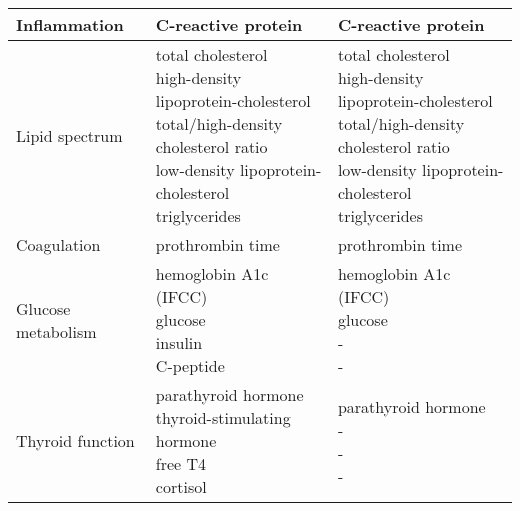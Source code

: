 \documentclass[10pt,a4paper]{article}
\begin{document}
\begin{table}
\begin{tabular}{lll}
			Inflammation          & C-reactive protein                                                                                                                                  & C-reactive protein                                                                                                                                  \\ \hline
			Lipid spectrum        & total \makecell{cholesterol\\high-density lipoprotein-cholesterol\\total/high-density cholesterol ratio \\low-density lipoprotein-cholesterol \\triglycerides} & \makecell{total cholesterol\\high-density lipoprotein-cholesterol\\total/high-density cholesterol ratio \\low-density lipoprotein-cholesterol \\triglycerides} \\ \hline
			Coagulation           & prothrombin time                                                                                                                                    & prothrombin time                                                                                                                                    \\ \hline
			Glucose metabolism    & \makecell{hemoglobin A1c (IFCC)\\glucose\\insulin\\C-peptide}                                                                                                  & \makecell{hemoglobin A1c (IFCC)\\glucose\\-\\-}                                                                                                                \\ \hline
			Thyroid function      & \makecell{parathyroid hormone\\thyroid-stimulating hormone\\free T4\\cortisol}                                                                                 & \makecell{parathyroid hormone\\-\\-\\-}                                                                                                                        \\ \hline

\end{tabular}
\end{table}
\end{document}
